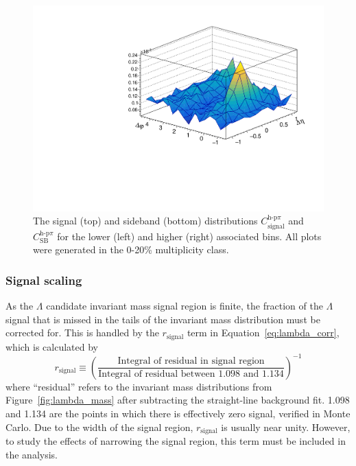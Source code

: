 \begin{figure}[ht]
\begin{minipage}{0.48\textwidth}
	\end{minipage}
	\begin{minipage}{0.48\textwidth}
		\includegraphics[width=\textwidth]{figures/analysis/h_lambda_rsb_dist_highpt.pdf}
	\end{minipage}
	\caption{The signal (top) and sideband (bottom) distributions $C_{\text{signal}}^{\text{h-p}\pi}$ and $C_{\text{SB}}^{\text{h-p}\pi}$ for the lower (left) and higher (right) associated \pt bins. All plots were generated in the 0-20\% multiplicity class.}
	\label{fig:lambda_signal_sideband}
\end{figure}

\subsubsection{Signal scaling}

As the $\Lambda$ candidate invariant mass signal region is finite, the fraction of the $\Lambda$ signal that is missed in the tails of the invariant mass distribution must be corrected for. This is handled by the $r_{\text{signal}}$ term in Equation~\ref{eq:lambda_corr}, which is calculated by 
%
\begin{equation}
	r_{\text{signal}} \equiv (\frac{\text{Integral of residual in signal region}}{\text{Integral of residual between 1.098 and 1.134}})^{-1}
\end{equation}
%
where ``residual'' refers to the invariant mass distributions from Figure~\ref{fig:lambda_mass} after subtracting the straight-line background fit. 1.098 and 1.134 are the points in which there is effectively zero signal, verified in Monte Carlo. Due to the width of the signal region, $r_{\text{signal}}$ is usually near unity. However, to study the effects of narrowing the signal region, this term must be included in the analysis.

